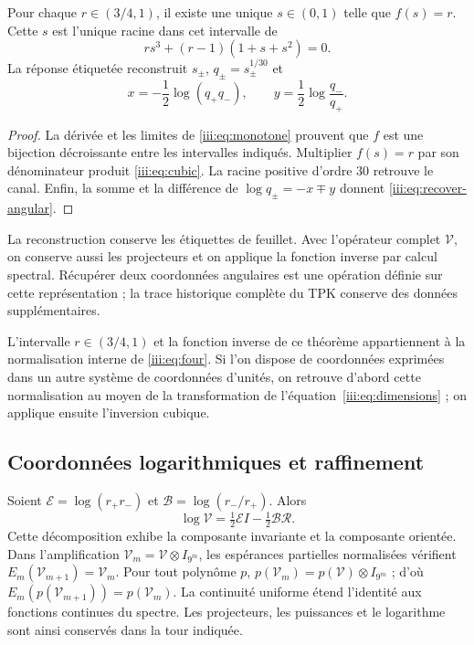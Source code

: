 \begin{theorem}
Pour chaque $r\in(3/4,1)$, il existe une unique $s\in(0,1)$ telle que $f(s)=r$.
Cette $s$ est l’unique racine dans cet intervalle de
\begin{equation}
 r s^3+(r-1)(1+s+s^2)=0.
 \label{iii:eq:cubic}
\end{equation}
La réponse étiquetée reconstruit $s_\pm$, $q_\pm=s_\pm^{1/30}$ et
\begin{equation}
 x=-\frac12\log(q_+q_-),\qquad
 y=\frac12\log\frac{q_-}{q_+}.
 \label{iii:eq:recover-angular}
\end{equation}
\end{theorem}
\begin{proof}
La dérivée et les limites de \eqref{iii:eq:monotone} prouvent que $f$ est une
bijection décroissante entre les intervalles indiqués. Multiplier $f(s)=r$
par son dénominateur produit \eqref{iii:eq:cubic}. La racine positive d’ordre
$30$ retrouve le canal. Enfin, la somme et la différence de
$\log q_\pm=-x\mp y$ donnent \eqref{iii:eq:recover-angular}.
\end{proof}

La reconstruction conserve les étiquettes de feuillet. Avec l’opérateur complet
$\mathcal V$, on conserve aussi les projecteurs et on applique la fonction
inverse par calcul spectral. Récupérer deux coordonnées angulaires est une
opération définie sur cette représentation ; la trace historique complète
du TPK conserve des données supplémentaires.

L’intervalle $r\in(3/4,1)$ et la fonction inverse de ce théorème appartiennent
à la normalisation interne de \eqref{iii:eq:four}. Si l’on dispose de
coordonnées exprimées dans un autre système de coordonnées d’unités, on retrouve d’abord
cette normalisation au moyen de la transformation de
l’équation~\eqref{iii:eq:dimensions} ; on applique ensuite l’inversion cubique.

\subsection{Coordonnées logarithmiques et raffinement}

Soient $\mathcal E=\log(r_+r_-)$ et $\mathcal B=\log(r_-/r_+)$. Alors
\begin{equation}
 \log\mathcal V=\tfrac12\mathcal E I-\tfrac12\mathcal B\mathcal R.
 \label{iii:eq:logvac}
\end{equation}
Cette décomposition exhibe la composante invariante et la composante orientée.
Dans l’amplification $\mathcal V_m=\mathcal V\otimes I_{9^m}$, les
espérances partielles normalisées vérifient
$E_m(\mathcal V_{m+1})=\mathcal V_m$. Pour tout polynôme $p$,
$p(\mathcal V_m)=p(\mathcal V)\otimes I_{9^m}$ ; d’où
$E_m(p(\mathcal V_{m+1}))=p(\mathcal V_m)$. La continuité uniforme
étend l’identité aux fonctions continues du spectre. Les projecteurs,
les puissances et le logarithme sont ainsi conservés dans la tour indiquée.

